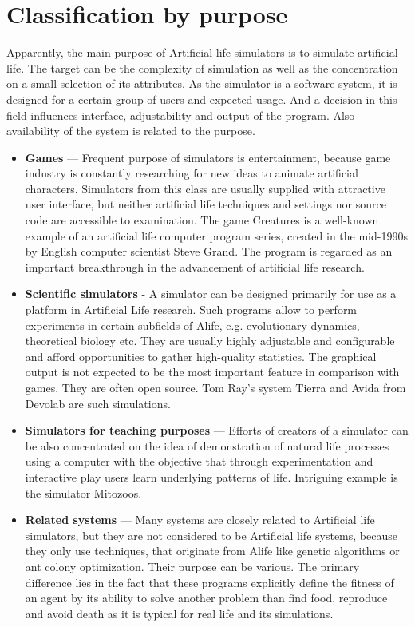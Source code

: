 \documentclass[a4paper,12pt]{report}
\begin{document}
\section{Classification by purpose}
Apparently, the main purpose of Artificial life simulators is to simulate artificial life. The target can be the complexity of simulation as well as the concentration on a small selection of its attributes. As the simulator is a software system, it is designed for a certain group of users and expected usage. And a decision in this field influences interface, adjustability and output of the program. Also availability of the system is related to the purpose. 
\begin{itemize}
  \item \textbf{Games} --- Frequent purpose of simulators is entertainment, because game industry is constantly researching for new ideas to animate artificial characters. Simulators from this class are usually supplied with attractive user interface, but neither artificial life techniques and settings nor source code are accessible to examination. The game Creatures is a well-known example of an artificial life computer program series, created in the mid-1990s by English computer scientist Steve Grand. The program is regarded as an important breakthrough in the advancement of artificial life research.
  \item \textbf{Scientific simulators} - A simulator can be designed primarily for use as a platform in Artificial Life research. Such programs allow to perform experiments in certain subfields of Alife, e.g. evolutionary dynamics, theoretical biology etc. They are usually highly adjustable and configurable and afford opportunities to gather high-quality statistics. The graphical output is not expected to be the most important feature in comparison with games. They are often open source. Tom Ray's system Tierra and Avida from Devolab are such simulations. 
  \item \textbf{Simulators for teaching purposes} --- Efforts of creators of a simulator can be also concentrated on the idea of demonstration of natural life processes using a computer with the objective that through experimentation and interactive play users learn underlying patterns of life. Intriguing example is the simulator Mitozoos. 
\item \textbf{Related systems} --- Many systems are closely related to Artificial life simulators, but they are not considered to be Artificial life systems, because they only use techniques, that originate from Alife like genetic algorithms or ant colony optimization. Their purpose can be various. The primary difference lies in the fact that these programs explicitly define the fitness of an agent by its ability to solve another problem than find food, reproduce and avoid death as it is typical for real life and its simulations. 
\end{itemize}
\end{document}
